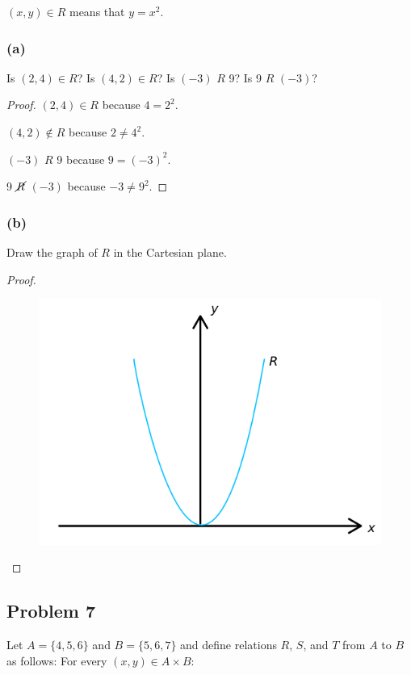 \documentclass[14pt]{extarticle}
\begin{document}
\begin{center}
$(x, y) \in R$ means that $y = x^2$.
\end{center}

\subsubsection{(a)}
Is $(2, 4) \in R$? Is $(4, 2) \in R$? Is $(-3)$ $R$ 9? Is 9 $R$ $(-3)$?

\begin{proof}
$(2, 4) \in R$ because $4 = 2^2$.

$(4, 2) \notin R$ because $2 \neq 4^2$.

$(-3)$ $R$ 9 because $9 = (-3)^2$.

9 $\cancel{R}$ $(-3)$ because $-3 \neq 9^2$.
\end{proof}

\subsubsection{(b)}
Draw the graph of $R$ in the Cartesian plane.

\begin{proof}
\begin{figure}[ht!]
\centering
\includegraphics[scale=0.5]{../images/1.3.6.png}
\end{figure}
\end{proof}

\subsection{Problem 7}
Let $A = \{4, 5, 6\}$ and $B = \{5, 6, 7\}$ and define relations $R$, $S$, and
$T$ from $A$ to $B$ as follows: For every $(x, y) \in A \times B$:
\end{document}
